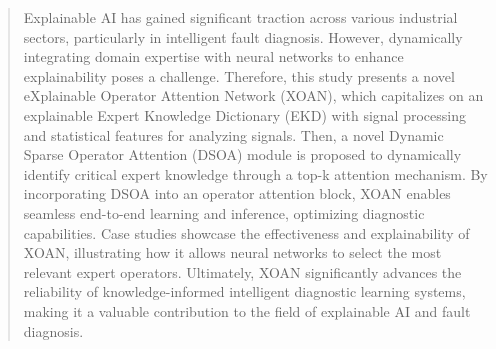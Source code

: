 \documentclass[lettersize,journal]{IEEEtran}
\begin{document}
\begin{abstract}

 Explainable AI has gained significant traction across various industrial sectors, particularly in intelligent fault diagnosis. However, dynamically integrating domain expertise with neural networks to enhance explainability poses a challenge. Therefore, this study presents a novel eXplainable Operator Attention Network (XOAN), which capitalizes on an explainable Expert Knowledge Dictionary (EKD) with signal processing and statistical features for analyzing signals. Then, a novel Dynamic Sparse Operator Attention (DSOA) module is proposed to dynamically identify critical expert knowledge through a top-k attention mechanism. By incorporating DSOA into an operator attention block, XOAN enables seamless end-to-end learning and inference, optimizing diagnostic capabilities. Case studies showcase the effectiveness and explainability of XOAN, illustrating how it allows neural networks to select the most relevant expert operators. Ultimately, XOAN significantly advances the reliability of knowledge-informed intelligent diagnostic learning systems, making it a valuable contribution to the field of explainable AI and fault diagnosis.





\end{abstract}
\end{document}
